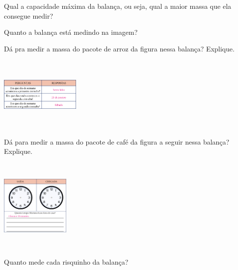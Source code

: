 \begin{escolha}
\item  Qual a capacidade máxima da balança, ou seja, qual a maior massa que ela consegue medir?


\item  Quanto a balança está medindo na imagem?


\item  Dá pra medir a massa do pacote de arroz da figura nessa balança? Explique.


\includegraphics[width=1.53125in,height=1.43597in]{media/image53.png}


\item  Dá para medir a massa do pacote de café da figura a seguir nessa balança? Explique.


\includegraphics[width=1.32094in,height=1.80208in]{media/image54.png}


\item  Quanto mede cada risquinho da balança?

\end{escolha}

